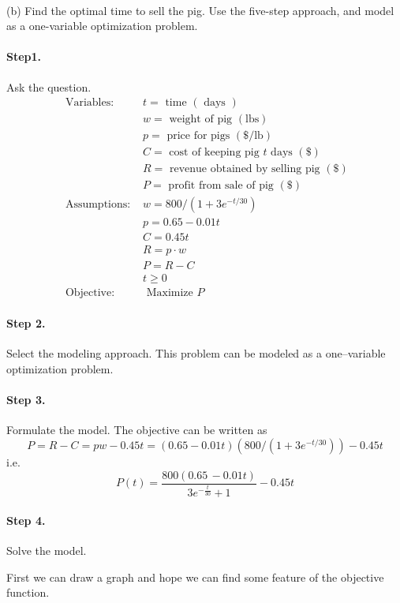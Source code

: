\documentclass[11pt]{article}
\begin{document}
\

(b) Find the optimal time to sell the pig. Use the five-step approach, and model as a one-variable optimization problem.
\paragraph{Step1.} Ask the question.
$$
\begin{array}{ll}
\text { Variables: } & t=\text { time }(\text { days }) \\
& w=\text { weight of pig }(\mathrm{lbs}) \\
& p=\text { price for pigs }(\$ / \mathrm{lb}) \\
& C=\text { cost of keeping pig } t \text { days }(\$) \\
& R=\text { revenue obtained by selling pig }(\$) \\
& P=\text { profit from sale of pig }(\$) \\
\text { Assumptions: } & w=800 /\left(1+3 e^{-t / 30}\right)\\
& p=0.65-0.01 t \\
& C=0.45 t \\
& R=p \cdot w \\
& P=R-C \\
& t \geq 0 \\
\text { Objective: } \quad & \text { Maximize } P
\end{array}
$$

\paragraph{Step 2.} Select the modeling approach.
This problem can be modeled as a one–variable optimization problem.

\paragraph{Step 3.} Formulate the model.
The objective can be written as
$$
P = R - C = pw - 0.45t = (0.65 - 0.01t)(800/(1+3e^{-t/30})) - 0.45t
$$
i.e.
$$
P(t) = \frac{800 (0.65\, -0.01 t)}{3 e^{-\frac{t}{30}}+1}-0.45 t
$$
\paragraph{Step 4.} Solve the model.

First we can draw a graph and hope we can find some feature of the objective function.
\end{document}
